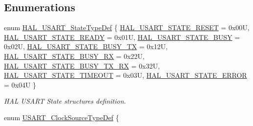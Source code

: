 \subsection*{Enumerations}
\begin{DoxyCompactItemize}
\item 
enum \hyperlink{group___u_s_a_r_t___exported___types_ga502e7abdfa6b24f0f6b40cf60c7383c5}{H\+A\+L\+\_\+\+U\+S\+A\+R\+T\+\_\+\+State\+Type\+Def} \{ \newline
\hyperlink{group___u_s_a_r_t___exported___types_gga502e7abdfa6b24f0f6b40cf60c7383c5ab78adc4ded45529f2cf9e74150e49696}{H\+A\+L\+\_\+\+U\+S\+A\+R\+T\+\_\+\+S\+T\+A\+T\+E\+\_\+\+R\+E\+S\+ET} = 0x00U, 
\hyperlink{group___u_s_a_r_t___exported___types_gga502e7abdfa6b24f0f6b40cf60c7383c5ac707f3dc06c16fce84d167b03441e3d1}{H\+A\+L\+\_\+\+U\+S\+A\+R\+T\+\_\+\+S\+T\+A\+T\+E\+\_\+\+R\+E\+A\+DY} = 0x01U, 
\hyperlink{group___u_s_a_r_t___exported___types_gga502e7abdfa6b24f0f6b40cf60c7383c5af29d38beb8203761692149ce14a9cbdb}{H\+A\+L\+\_\+\+U\+S\+A\+R\+T\+\_\+\+S\+T\+A\+T\+E\+\_\+\+B\+U\+SY} = 0x02U, 
\hyperlink{group___u_s_a_r_t___exported___types_gga502e7abdfa6b24f0f6b40cf60c7383c5a2ee8ab5e15829c484ab4c4fbec68d3f6}{H\+A\+L\+\_\+\+U\+S\+A\+R\+T\+\_\+\+S\+T\+A\+T\+E\+\_\+\+B\+U\+S\+Y\+\_\+\+TX} = 0x12U, 
\newline
\hyperlink{group___u_s_a_r_t___exported___types_gga502e7abdfa6b24f0f6b40cf60c7383c5a4943f2dd7af684bfad7688b16e149f0d}{H\+A\+L\+\_\+\+U\+S\+A\+R\+T\+\_\+\+S\+T\+A\+T\+E\+\_\+\+B\+U\+S\+Y\+\_\+\+RX} = 0x22U, 
\hyperlink{group___u_s_a_r_t___exported___types_gga502e7abdfa6b24f0f6b40cf60c7383c5aab5458c5e3bf1fbd3065ef8fb0109e63}{H\+A\+L\+\_\+\+U\+S\+A\+R\+T\+\_\+\+S\+T\+A\+T\+E\+\_\+\+B\+U\+S\+Y\+\_\+\+T\+X\+\_\+\+RX} = 0x32U, 
\hyperlink{group___u_s_a_r_t___exported___types_gga502e7abdfa6b24f0f6b40cf60c7383c5a7e3fd9d81ea140c60b8ace92fa0efb06}{H\+A\+L\+\_\+\+U\+S\+A\+R\+T\+\_\+\+S\+T\+A\+T\+E\+\_\+\+T\+I\+M\+E\+O\+UT} = 0x03U, 
\hyperlink{group___u_s_a_r_t___exported___types_gga502e7abdfa6b24f0f6b40cf60c7383c5a3bd9b34183b2942ab9b8bb8e9f2beb13}{H\+A\+L\+\_\+\+U\+S\+A\+R\+T\+\_\+\+S\+T\+A\+T\+E\+\_\+\+E\+R\+R\+OR} = 0x04U
 \}\begin{DoxyCompactList}\small\item\em H\+AL U\+S\+A\+RT State structures definition. \end{DoxyCompactList}
\item 
enum \hyperlink{group___u_s_a_r_t___exported___types_ga1078d736732d921b19a0b0f76e323147}{U\+S\+A\+R\+T\+\_\+\+Clock\+Source\+Type\+Def} \{ \newline

\end{DoxyCompactItemize}
